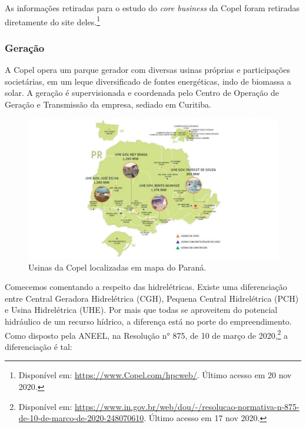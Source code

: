 \documentclass[grad,numbers]{coppe}
\begin{document}
  As informações retiradas para o estudo do \emph{core business} da Copel foram retiradas diretamente do site deles.\footnote{Disponível em: \url{https://www.Copel.com/hpcweb/}. Último acesso em 20 nov 2020.}

  \hypertarget{gerauxe7uxe3o}{%
  \subsubsection{Geração}\label{gerauxe7uxe3o}}

  A Copel opera um parque gerador com diversas usinas próprias e participações societárias, em um leque diversificado de fontes energéticas, indo de biomassa a solar. A geração é supervisionada e coordenada pelo Centro de Operação de Geração e Transmissão da empresa, sediado em Curitiba.
  \begin{figure}[H]
  \includegraphics[width=1\linewidth]{img/usinas_Copel} \caption{Usinas da Copel localizadas em mapa do Paraná.}\label{fig:unnamed-chunk-2}
  \end{figure}
  Comecemos comentando a respeito das hidrelétricas. Existe uma diferenciação entre Central Geradora Hidrelétrica (CGH), Pequena Central Hidrelétrica (PCH) e Usina Hidrelétrica (UHE). Por mais que todas se aproveitem do potencial hidráulico de um recurso hídrico, a diferença está no porte do empreendimento. Como disposto pela ANEEL, na Resolução n° 875, de 10 de março de 2020,\footnote{Disponível em: \url{https://www.in.gov.br/web/dou/-/resolucao-normativa-n-875-de-10-de-marco-de-2020-248070610}. Último acesso em 17 nov 2020.} a diferenciação é tal:
\end{document}
